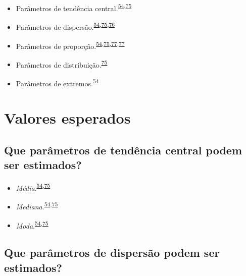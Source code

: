 \documentclass[
  a4paper,
]{book}
\begin{document}
\begin{itemize}
\item
  Parâmetros de tendência central.\textsuperscript{\protect\hyperlink{ref-Ali2016}{54},\protect\hyperlink{ref-kanji2006}{75}}
\item
  Parâmetros de dispersão.\textsuperscript{\protect\hyperlink{ref-Ali2016}{54},\protect\hyperlink{ref-kanji2006}{75},\protect\hyperlink{ref-Curran-Everett2008}{76}}
\item
  Parâmetros de proporção.\textsuperscript{\protect\hyperlink{ref-Ali2016}{54},\protect\hyperlink{ref-kanji2006}{75},\protect\hyperlink{ref-Altman1994}{77},\protect\hyperlink{ref-Altman1994}{77}}
\item
  Parâmetros de distribuição.\textsuperscript{\protect\hyperlink{ref-kanji2006}{75}}
\item
  Parâmetros de extremos.\textsuperscript{\protect\hyperlink{ref-Ali2016}{54}}
\end{itemize}

\hypertarget{valores-esperados}{%
\section{Valores esperados}\label{valores-esperados}}

\hypertarget{que-paruxe2metros-de-tenduxeancia-central-podem-ser-estimados}{%
\subsection{Que parâmetros de tendência central podem ser estimados?}\label{que-paruxe2metros-de-tenduxeancia-central-podem-ser-estimados}}

\begin{itemize}
\item
  \emph{Média}.\textsuperscript{\protect\hyperlink{ref-Ali2016}{54},\protect\hyperlink{ref-kanji2006}{75}}
\item
  \emph{Mediana}.\textsuperscript{\protect\hyperlink{ref-Ali2016}{54},\protect\hyperlink{ref-kanji2006}{75}}
\item
  \emph{Moda}.\textsuperscript{\protect\hyperlink{ref-Ali2016}{54},\protect\hyperlink{ref-kanji2006}{75}}
\end{itemize}

\hypertarget{que-paruxe2metros-de-dispersuxe3o-podem-ser-estimados}{%
\subsection{Que parâmetros de dispersão podem ser estimados?}\label{que-paruxe2metros-de-dispersuxe3o-podem-ser-estimados}}
\end{document}

